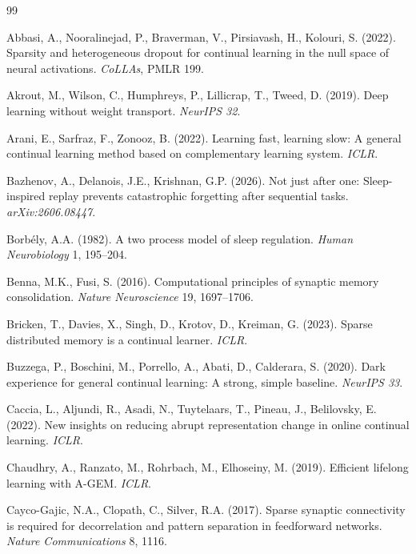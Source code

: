 \documentclass{article}
\begin{document}
\clearpage
\begin{thebibliography}{99}\small

 Abbasi, A., Nooralinejad, P., Braverman, V., Pirsiavash, H., Kolouri, S. (2022). Sparsity and heterogeneous dropout for continual learning in the null space of neural activations. \emph{CoLLAs}, PMLR 199.

 Akrout, M., Wilson, C., Humphreys, P., Lillicrap, T., Tweed, D. (2019). Deep learning without weight transport. \emph{NeurIPS 32}.

 Arani, E., Sarfraz, F., Zonooz, B. (2022). Learning fast, learning slow: A general continual learning method based on complementary learning system. \emph{ICLR}.

 Bazhenov, A., Delanois, J.E., Krishnan, G.P. (2026). Not just after one: Sleep-inspired replay prevents catastrophic forgetting after sequential tasks. \emph{arXiv:2606.08447}.

 Borb\'ely, A.A. (1982). A two process model of sleep regulation. \emph{Human Neurobiology} 1, 195--204.

 Benna, M.K., Fusi, S. (2016). Computational principles of synaptic memory consolidation. \emph{Nature Neuroscience} 19, 1697--1706.

 Bricken, T., Davies, X., Singh, D., Krotov, D., Kreiman, G. (2023). Sparse distributed memory is a continual learner. \emph{ICLR}.

 Buzzega, P., Boschini, M., Porrello, A., Abati, D., Calderara, S. (2020). Dark experience for general continual learning: A strong, simple baseline. \emph{NeurIPS 33}.

 Caccia, L., Aljundi, R., Asadi, N., Tuytelaars, T., Pineau, J., Belilovsky, E. (2022). New insights on reducing abrupt representation change in online continual learning. \emph{ICLR}.

 Chaudhry, A., Ranzato, M., Rohrbach, M., Elhoseiny, M. (2019). Efficient lifelong learning with A-GEM. \emph{ICLR}.

 Cayco-Gajic, N.A., Clopath, C., Silver, R.A. (2017). Sparse synaptic connectivity is required for decorrelation and pattern separation in feedforward networks. \emph{Nature Communications} 8, 1116.


\end{thebibliography}
\end{document}
